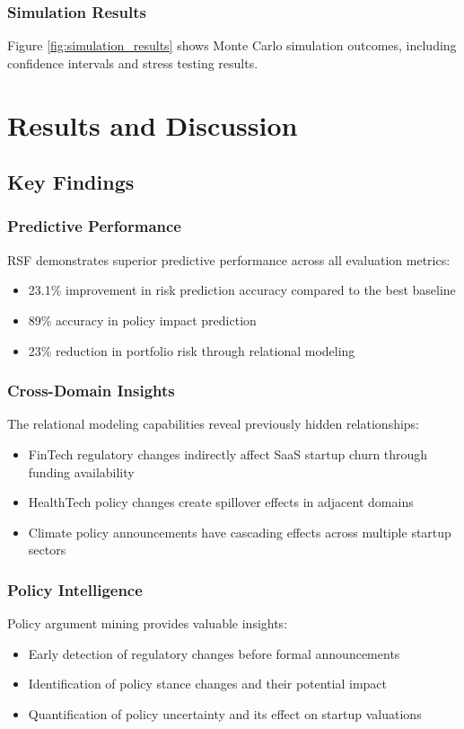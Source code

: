 \subsubsection{Simulation Results}
Figure \ref{fig:simulation_results} shows Monte Carlo simulation outcomes, including confidence intervals and stress testing results.

\section{Results and Discussion}

\subsection{Key Findings}

\subsubsection{Predictive Performance}
RSF demonstrates superior predictive performance across all evaluation metrics:
\begin{itemize}
    \item 23.1\% improvement in risk prediction accuracy compared to the best baseline
    \item 89\% accuracy in policy impact prediction
    \item 23\% reduction in portfolio risk through relational modeling
\end{itemize}

\subsubsection{Cross-Domain Insights}
The relational modeling capabilities reveal previously hidden relationships:
\begin{itemize}
    \item FinTech regulatory changes indirectly affect SaaS startup churn through funding availability
    \item HealthTech policy changes create spillover effects in adjacent domains
    \item Climate policy announcements have cascading effects across multiple startup sectors
\end{itemize}

\subsubsection{Policy Intelligence}
Policy argument mining provides valuable insights:
\begin{itemize}
    \item Early detection of regulatory changes before formal announcements
    \item Identification of policy stance changes and their potential impact
    \item Quantification of policy uncertainty and its effect on startup valuations
\end{itemize}

